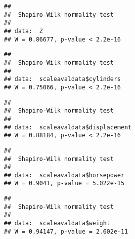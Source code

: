 \documentclass[]{article}
\newenvironment{Shaded}{\begin{snugshade}}{\end{snugshade}}
\newcommand{\KeywordTok}[1]{\textcolor[rgb]{0.13,0.29,0.53}{\textbf{#1}}}
\newcommand{\OperatorTok}[1]{\textcolor[rgb]{0.81,0.36,0.00}{\textbf{#1}}}
\newcommand{\NormalTok}[1]{#1}
\begin{document}
\begin{verbatim}
## 
##  Shapiro-Wilk normality test
## 
## data:  Z
## W = 0.86677, p-value < 2.2e-16
\end{verbatim}

\begin{Shaded}
\end{Shaded}

\begin{verbatim}
## 
##  Shapiro-Wilk normality test
## 
## data:  scaleavaldata$cylinders
## W = 0.75066, p-value < 2.2e-16
\end{verbatim}

\begin{Shaded}
\end{Shaded}

\begin{verbatim}
## 
##  Shapiro-Wilk normality test
## 
## data:  scaleavaldata$displacement
## W = 0.88184, p-value < 2.2e-16
\end{verbatim}

\begin{Shaded}
\end{Shaded}

\begin{verbatim}
## 
##  Shapiro-Wilk normality test
## 
## data:  scaleavaldata$horsepower
## W = 0.9041, p-value = 5.022e-15
\end{verbatim}

\begin{Shaded}
\end{Shaded}

\begin{verbatim}
## 
##  Shapiro-Wilk normality test
## 
## data:  scaleavaldata$weight
## W = 0.94147, p-value = 2.602e-11
\end{verbatim}
\end{document}
